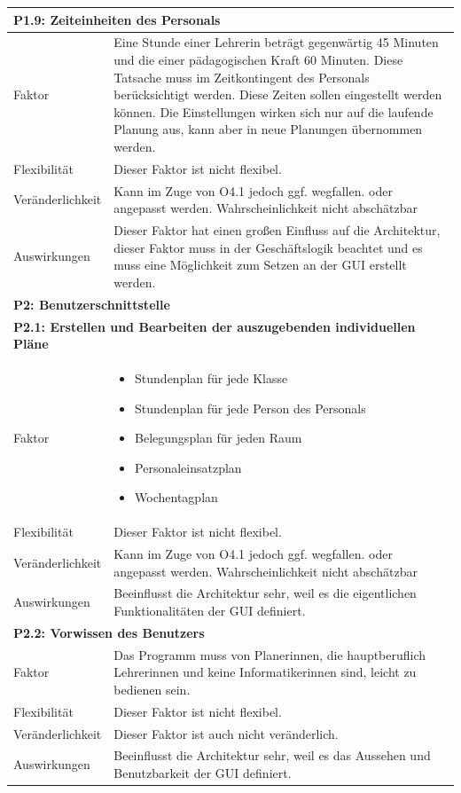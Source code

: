 \documentclass[fontsize=12pt,paper=a4,twoside]{scrartcl}
\begin{document}
\begin{tabularx}{\textwidth}{|l|X|}
\hline
\multicolumn{2}{|l|}{\textbf{P1.9: Zeiteinheiten des Personals}}\\\hline
Faktor & Eine Stunde einer Lehrerin beträgt gegenwärtig 45 Minuten und die einer pädagogischen Kraft 60 Minuten. Diese Tatsache muss im Zeitkontingent des Personals berücksichtigt werden. Diese Zeiten sollen eingestellt werden können. Die Einstellungen wirken sich nur auf die laufende Planung aus, kann aber in neue Planungen übernommen werden. \\\hline
Flexibilität & Dieser Faktor ist nicht flexibel. \\\hline
Veränderlichkeit & Kann im Zuge von O4.1 jedoch ggf. wegfallen. oder angepasst werden.  Wahrscheinlichkeit nicht abschätzbar \\\hline
Auswirkungen & Dieser Faktor hat einen großen Einfluss auf die Architektur, dieser Faktor muss in der Geschäftslogik beachtet und es muss eine Möglichkeit zum Setzen an der GUI erstellt werden. \\\hline
\multicolumn{2}{|l|}{\textbf{P2: Benutzerschnittstelle}}\\\hline
\multicolumn{2}{|l|}{\textbf{P2.1: Erstellen und Bearbeiten der auszugebenden individuellen
 Pläne}}\\\hline
 Faktor & \begin{itemize}[topsep=0cm, leftmargin=0.5cm, itemsep=0pt]
 \item Stundenplan für jede Klasse
 \item Stundenplan für jede Person des Personals
 \item Belegungsplan für jeden Raum
 \item Personaleinsatzplan 
 \item Wochentagplan
 \end{itemize} \\\hline
 Flexibilität & Dieser Faktor ist nicht flexibel. \\\hline
 Veränderlichkeit & Kann im Zuge von O4.1 jedoch ggf. wegfallen. oder angepasst werden.  Wahrscheinlichkeit nicht abschätzbar \\\hline
 Auswirkungen & Beeinflusst die Architektur sehr, weil es die eigentlichen Funktionalitäten der GUI definiert.  \\\hline
\multicolumn{2}{|l|}{\textbf{P2.2: Vorwissen des Benutzers}}\\\hline
Faktor & Das Programm muss von Planerinnen, die hauptberuflich Lehrerinnen und keine Informatikerinnen sind, leicht zu bedienen sein. \\\hline
Flexibilität & Dieser Faktor ist nicht flexibel. \\\hline
Veränderlichkeit & Dieser Faktor ist auch nicht veränderlich. \\\hline
Auswirkungen & Beeinflusst die Architektur sehr, weil es das Aussehen und Benutzbarkeit der GUI definiert.  \\\hline
\end{tabularx}\\
\end{document}

